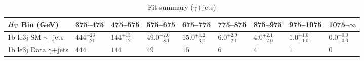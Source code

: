\documentclass[8pt]{article}
\def\scalht{\mbox{$H_{\rm{T}}$}\xspace}
\newcommand\T{\rule{0pt}{2.6ex}}
\begin{document}
\begin{table}[ht!]
\caption{Fit summary ($\gamma$+jets)}
\label{tab:ensemble-summary}
\centering
\begin{tabular}{ lllllllll }

\hline
\scalht Bin (GeV)       & 375--475                       & 475--575                       & 575--675                       & 675--775                       & 775--875                       & 875--975                       & 975--1075                      & 1075--$\infty$                 \\ [1.000000ex]
\hline
1b le3j SM $\gamma$+jets\T & $444^{+23}_{-21}$              & $144^{+13}_{-12}$              & $49.0^{+7.0}_{-8.1}$           & $15.0^{+4.2}_{-3.1}$           & $6.0^{+2.9}_{-2.1}$            & $4.0^{+2.1}_{-2.0}$            & $1.0^{+1.0}_{-1.0}$            & $0.0^{+0.0}_{-0.0}$            \\ 
1b le3j Data $\gamma$+jets\T & $444$                          & $144$                          & $49$                           & $15$                           & $6$                            & $4$                            & $1$                            & $0$                            \\ 
\hline

\end{tabular}
\end{table}
\end{document}
